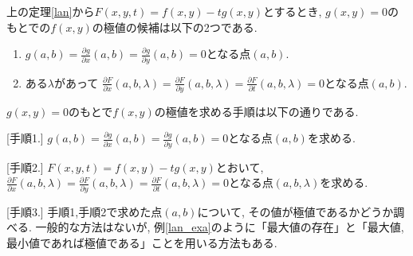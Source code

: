 \documentclass[dvipdfmx,a4paper,11pt]{article}
\theoremstyle{definition}
\newcommand{\pdrv}[2]{\frac{\partial #1}{\partial #2}}
\begin{document}
 上の定理\ref{lan}から$F(x,y,t) = f(x,y)-tg(x,y)$とするとき, 
 $g(x,y)=0$のもとでの$f(x,y)$の極値の候補は以下の2つである.
 \begin{enumerate}
   \setlength{\parskip}{0cm} 
  \setlength{\itemsep}{0cm}
  \item $g(a,b)=\pdrv{g}{x}(a,b)=\pdrv{g}{y}(a,b)=0$となる点$(a,b)$.
 \item ある$\lambda$があって
 $\pdrv{F}{x}(a,b,\lambda) = \pdrv{F}{y}(a,b,\lambda) = \pdrv{F}{t}(a,b,\lambda)=0$となる点$(a,b)$.
 \end{enumerate}




 \begin{tcolorbox}[
    colback = white,
    colframe = green!35!black,
    fonttitle = \bfseries,
    breakable = true]

 $g(x,y)=0$のもとで$f(x,y)$の極値を求める手順は以下の通りである.
 
 \begin{description}


 \item{[手順1.]} $g(a,b)=\pdrv{g}{x}(a,b)=\pdrv{g}{y}(a,b)=0$となる点$(a,b)$を求める.
 
   \item{[手順2.]} $F(x,y,t) = f(x,y)-tg(x,y)$とおいて, 
   $\pdrv{F}{x}(a,b,\lambda) = \pdrv{F}{y}(a,b,\lambda) = \pdrv{F}{t}(a,b,\lambda)=0$となる点$(a,b,\lambda)$を求める. %
   
 \item{[手順3.]} 手順1,手順2で求めた点$(a,b)$について, その値が極値であるかどうか調べる.
一般的な方法はないが, 例\ref{lan_exa}のように「最大値の存在」と「最大値, 最小値であれば極値である」ことを用いる方法もある.
 \end{description}

    \end{tcolorbox}
    
\end{document}
